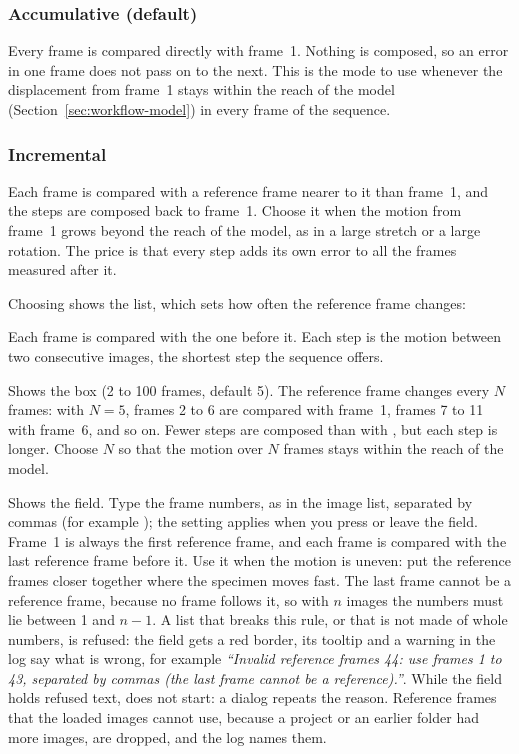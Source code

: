 \subsubsection*{Accumulative (default)}

Every frame is compared directly with frame~1. Nothing is composed, so an error in one frame
does not pass on to the next. This is the mode to use whenever the displacement from frame~1
stays within the reach of the model (Section~\ref{sec:workflow-model}) in every frame of the
sequence.

\subsubsection*{Incremental}

Each frame is compared with a reference frame nearer to it than frame~1, and the steps are
composed back to frame~1. Choose it when the motion from frame~1 grows beyond the reach of the model, as in a
large stretch or a large rotation. The price is that every step adds its own error to all the
frames measured after it.

Choosing  shows the  list, which sets how often the
reference frame changes:
\begin{description}[leftmargin=1.2cm,style=nextline]
  \item[Every Frame (default)]
    Each frame is compared with the one before it. Each step is the motion between two
    consecutive images, the shortest step the sequence offers.
  \item[Every N Frames]
    Shows the  box (2 to 100 frames, default 5). The reference frame changes every
    $N$ frames: with $N = 5$, frames 2 to 6 are compared with frame~1, frames 7 to 11 with
    frame~6, and so on. Fewer steps are composed than with , but each step is
    longer. Choose $N$ so that the motion over $N$ frames stays within the reach of the model.
  \item[Custom Frames]
    Shows the  field. Type the frame numbers, as in the image list,
    separated by commas (for example ); the setting applies when you press
     or leave the field. Frame~1 is always the first reference frame, and each frame
    is compared with the last reference frame before it. Use it when the motion is uneven: put
    the reference frames closer together where the specimen moves fast. The last frame cannot be
    a reference frame, because no frame follows it, so with $n$ images the numbers must lie
    between 1 and $n-1$. A list that breaks this rule, or that is not made of whole numbers, is
    refused: the field gets a red border, its tooltip and a warning in the log say what is wrong,
    for example \emph{``Invalid reference frames 44: use frames 1 to 43, separated by commas (the
    last frame cannot be a reference).''}. While the field holds refused text,  does not start: a  dialog repeats the reason. Reference
    frames
    that the loaded images cannot use, because a project or an earlier folder had more images,
    are dropped, and the log names them.
\end{description}

